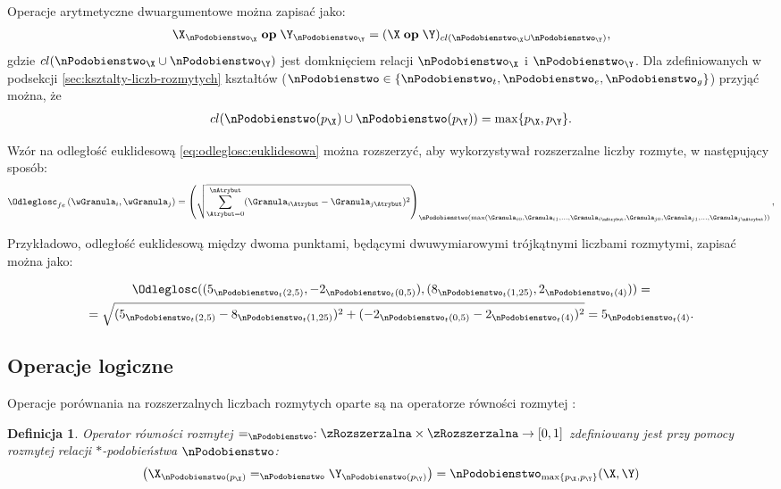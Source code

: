 \documentclass[a4paper,twoside,12pt]{book}
\newtheorem{Definition}{Definicja}
\begin{document}
Operacje arytmetyczne dwuargumentowe można zapisać jako:
\begin{align}
	\label{eq:fuzzy-arithmetics-two-arguments}
	\X_{\nPodobienstwo_{\X}} \; \mathbf{op} \; \Y_{\nPodobienstwo_{\Y}} = (\X \; \mathbf{op} \; \Y)_{cl(\nPodobienstwo_{\X} \cup \nPodobienstwo_{\Y})},
\end{align}
gdzie $cl(\nPodobienstwo_{\X} \cup \nPodobienstwo_{\Y})$ jest domknięciem relacji $\nPodobienstwo_{\X}$ i $\nPodobienstwo_{\Y}$. Dla zdefiniowanych w podsekcji \ref{sec:ksztalty-liczb-rozmytych} kształtów ($\nPodobienstwo \in \{ \nPodobienstwo_{t}, \nPodobienstwo_{e}, \nPodobienstwo_{g}\}$) przyjąć można, że
\begin{align}
	cl(\nPodobienstwo(p_{\X}) \cup \nPodobienstwo(p_{\Y})) = \max\{p_{\X}, p_{\Y}\}.
\end{align}

Wzór na odległość euklidesową \eqref{eq:odleglosc:euklidesowa} można rozszerzyć, aby wykorzystywał rozszerzalne liczby rozmyte, w następujący sposób:  
%
\begin{align}
	\Odleglosc_{fe} \left(\wGranula_{i}, \wGranula_{j}\right) = \left(\sqrt{\sum_{\Atrybut=0}^{\nAtrybut}(\Granula_{i\Atrybut} - \Granula_{j\Atrybut })^{2}}\right)_{\nPodobienstwo(\max(\Granula_{i0}, \Granula_{i1}, \dots, \Granula_{i\nAtrybut}, \Granula_{j0}, \Granula_{j1}, \dots, \Granula_{j\nAtrybut}))},
	\label{eq:rozmyta:odleglosc:euklidesowa}
\end{align}

Przykładowo, odległość euklidesową między dwoma punktami, będącymi dwuwymiarowymi trójkątnymi liczbami rozmytymi, zapisać można jako:

\begin{multline}
	\Odleglosc ((5_{\nPodobienstwo_{t}(2,5)}, -2_{\nPodobienstwo_{t}(0,5)}), (8_{\nPodobienstwo_{t}(1,25)}, 2_{\nPodobienstwo_{t}(4)})) = \\
	= \sqrt{(5_{\nPodobienstwo_{t}(2,5)} - 8_{\nPodobienstwo_{t}(1,25)})^{2} + (-2_{\nPodobienstwo_{t}(0,5)} - 2_{\nPodobienstwo_{t}(4)})^{2}} = 5_{\nPodobienstwo_{t}(4)}.
\end{multline}

\subsection{Operacje logiczne}
Operacje porównania na rozszerzalnych liczbach rozmytych oparte są na operatorze równości rozmytej \cite{bib:fuzzy-numbers-revisited-logic-operations}:
\begin{Definition}
	Operator równości rozmytej $=_{\nPodobienstwo}: \zRozszerzalna \times \zRozszerzalna \to [0,1]$ zdefiniowany jest przy pomocy rozmytej relacji $\ast$-podobieństwa $\nPodobienstwo$:
	\begin{align}
		\label{eq:fuzzy-equality}
		\left(\X_{\nPodobienstwo(p_{\X})} =_{\nPodobienstwo} \Y_{\nPodobienstwo(p_{\Y})}\right) = \nPodobienstwo_{\max\{p_{\X},p_{\Y}\}}(\X, \Y)
	\end{align}
\end{Definition}
\end{document}
